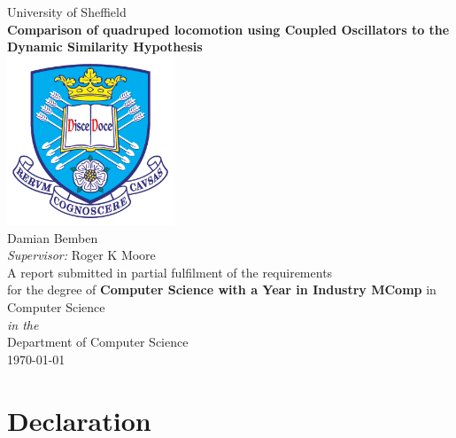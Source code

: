 \documentclass[11pt,oneside]{book}
\begin{document}

\frontmatter

\begin{titlepage}



\begin{center}
{\LARGE University of Sheffield}\\[1.5cm]
\linespread{1.2}\huge {\bfseries Comparison of quadruped locomotion using Coupled Oscillators to the Dynamic Similarity Hypothesis}\\[1.5cm]
\linespread{1}
\includegraphics[width=5cm]{images/tuoslogo.png}\\[1cm]
{\Large Damian Bemben}\\[1cm]
{\large \emph{Supervisor:} Roger K Moore}\\[1cm] %
\large A report submitted in partial fulfilment of the requirements\\ for the degree of \textbf{Computer Science with a Year in Industry MComp} 
 in Computer Science\\[0.3cm] 
\textit{in the}\\[0.3cm]
Department of Computer Science\\[1cm]
\today
\end{center}
\end{titlepage}



\newpage
\section*{\Large Declaration}
\end{document}

